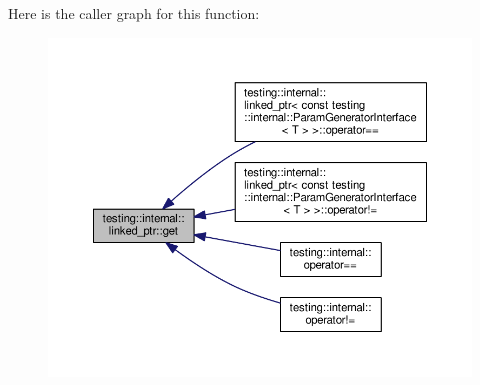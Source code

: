 Here is the caller graph for this function\-:\nopagebreak
\begin{figure}[H]
\begin{center}
\leavevmode
\includegraphics[width=350pt]{classtesting_1_1internal_1_1linked__ptr_a6ea8584d9bcad13c3266834f5ce5e771_icgraph}
\end{center}
\end{figure}


